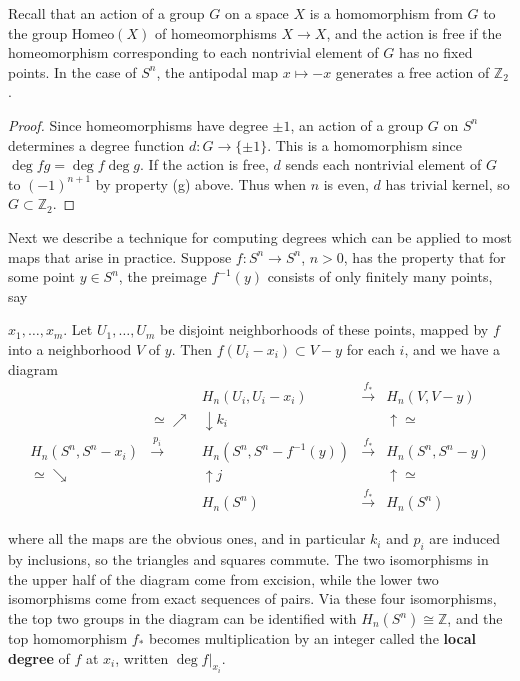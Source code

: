 Recall that an action of a group $G$ on a space $X$ is a homomorphism from $G$ to the group Homeo$(X)$ of homeomorphisms $X \to X$, and the action is free if the homeomorphism corresponding to each nontrivial element of $G$ has no fixed points. In the case of $S^n$, the antipodal map $x \mapsto -x$ generates a free action of $\mathbb{Z}_2$.
\begin{proof}
 Since homeomorphisms have degree $\pm 1$, an action of a group $G$ on $S^n$ determines a degree function $d: G \to \{\pm 1\}$. This is a homomorphism since $\deg fg = \deg f \deg g$. If the action is free, $d$ sends each nontrivial element of $G$ to $(-1)^{n+1}$ by property (g) above. Thus when $n$ is even, $d$ has trivial kernel, so $G \subset \mathbb{Z}_2$.
\end{proof}
Next we describe a technique for computing degrees which can be applied to most maps that arise in practice. Suppose $f: S^n \to S^n$, $n > 0$, has the property that for some point $y \in S^n$, the preimage $f^{-1}(y)$ consists of only finitely many points, say

$x_1, \ldots, x_m$. Let $U_1, \ldots, U_m$ be disjoint neighborhoods of these points, mapped by $f$
into a neighborhood $V$ of $y$. Then $f(U_i - x_i) \subset V - y$ for each $i$, and we have a
diagram
\[
\begin{array}{ccccc}
  & & H_n(U_i, U_i - x_i) & \xrightarrow{f_*} & H_n(V, V - y) \\
  & \simeq \nearrow & \downarrow k_i & & \uparrow \simeq \\
  H_n(S^n, S^n - x_i) & \xrightarrow{p_i} & H_n(S^n, S^n - f^{-1}(y)) & \xrightarrow{f_*} & H_n(S^n, S^n - y) \\
  \simeq \searrow & & \uparrow j & & \uparrow \simeq \\
  & & H_n(S^n) & \xrightarrow{f_*} & H_n(S^n)
\end{array}
\]

where all the maps are the obvious ones, and in particular $k_i$ and $p_i$ are induced
by inclusions, so the triangles and squares commute. The two isomorphisms in the
upper half of the diagram come from excision, while the lower two isomorphisms come
from exact sequences of pairs. Via these four isomorphisms, the top two groups in the
diagram can be identified with $H_n(S^n) \cong \mathbb{Z}$, and the top homomorphism $f_*$ becomes
multiplication by an integer called the \textbf{local degree} of $f$ at $x_i$, written $\deg f|_{x_i}$.

